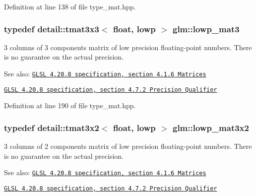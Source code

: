 Definition at line 138 of file type\_\-mat.hpp.\hypertarget{group__core__precision_gae2935658c6a3668ac1935a7f6064d51}{
\subsubsection[lowp\_\-mat3]{\setlength{\rightskip}{0pt plus 5cm}typedef detail::tmat3x3$<$ float, lowp $>$ {\bf glm::lowp\_\-mat3}}}
\label{group__core__precision_gae2935658c6a3668ac1935a7f6064d51}


3 columns of 3 components matrix of low precision floating-point numbers. There is no guarantee on the actual precision.

\begin{Desc}
\item[See also:]\href{http://www.opengl.org/registry/doc/GLSLangSpec.4.20.8.pdf}{\tt GLSL 4.20.8 specification, section 4.1.6 Matrices} 

\href{http://www.opengl.org/registry/doc/GLSLangSpec.4.20.8.pdf}{\tt GLSL 4.20.8 specification, section 4.7.2 Precision Qualifier} \end{Desc}


Definition at line 190 of file type\_\-mat.hpp.\hypertarget{group__core__precision_g17219f89f804dbf4620d4caacf32cfe2}{
\subsubsection[lowp\_\-mat3x2]{\setlength{\rightskip}{0pt plus 5cm}typedef detail::tmat3x2$<$ float, lowp $>$ {\bf glm::lowp\_\-mat3x2}}}
\label{group__core__precision_g17219f89f804dbf4620d4caacf32cfe2}


3 columns of 2 components matrix of low precision floating-point numbers. There is no guarantee on the actual precision.

\begin{Desc}
\item[See also:]\href{http://www.opengl.org/registry/doc/GLSLangSpec.4.20.8.pdf}{\tt GLSL 4.20.8 specification, section 4.1.6 Matrices} 

\href{http://www.opengl.org/registry/doc/GLSLangSpec.4.20.8.pdf}{\tt GLSL 4.20.8 specification, section 4.7.2 Precision Qualifier} \end{Desc}


